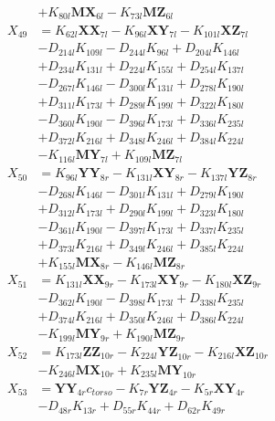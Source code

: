 \begin{multicols}{2}
\begin{align}
&+ K_{80l}\mathbf{MX}_{6l} - K_{73l}\mathbf{MZ}_{6l} \nonumber \\
X_{49} &= K_{62l}\mathbf{XX}_{7l} - K_{96l}\mathbf{XY}_{7l} - K_{101l}\mathbf{XZ}_{7l}  \nonumber \\
&- D_{214l}K_{109l} - D_{244l}K_{96l} + D_{204l}K_{146l}  \nonumber \\
&+ D_{234l}K_{131l} + D_{224l}K_{155l} + D_{254l}K_{137l}  \nonumber \\
&- D_{267l}K_{146l} - D_{300l}K_{131l} + D_{278l}K_{190l}  \nonumber \\
&+ D_{311l}K_{173l} + D_{289l}K_{199l} + D_{322l}K_{180l}  \nonumber \\
&- D_{360l}K_{190l} - D_{396l}K_{173l} + D_{336l}K_{235l}  \nonumber \\
&+ D_{372l}K_{216l} + D_{348l}K_{246l} + D_{384l}K_{224l}  \nonumber \\
&- K_{116l}\mathbf{MY}_{7l} + K_{109l}\mathbf{MZ}_{7l} \nonumber \\
X_{50} &= K_{96l}\mathbf{YY}_{8r} - K_{131l}\mathbf{XY}_{8r} - K_{137l}\mathbf{YZ}_{8r}  \nonumber \\
&- D_{268l}K_{146l} - D_{301l}K_{131l} + D_{279l}K_{190l}  \nonumber \\
&+ D_{312l}K_{173l} + D_{290l}K_{199l} + D_{323l}K_{180l}  \nonumber \\
&- D_{361l}K_{190l} - D_{397l}K_{173l} + D_{337l}K_{235l}  \nonumber \\
&+ D_{373l}K_{216l} + D_{349l}K_{246l} + D_{385l}K_{224l}  \nonumber \\
&+ K_{155l}\mathbf{MX}_{8r} - K_{146l}\mathbf{MZ}_{8r} \nonumber \\
X_{51} &= K_{131l}\mathbf{XX}_{9r} - K_{173l}\mathbf{XY}_{9r} - K_{180l}\mathbf{XZ}_{9r}  \nonumber \\
&- D_{362l}K_{190l} - D_{398l}K_{173l} + D_{338l}K_{235l}  \nonumber \\
&+ D_{374l}K_{216l} + D_{350l}K_{246l} + D_{386l}K_{224l}  \nonumber \\
&- K_{199l}\mathbf{MY}_{9r} + K_{190l}\mathbf{MZ}_{9r} \nonumber \\
X_{52} &= K_{173l}\mathbf{ZZ}_{10r} - K_{224l}\mathbf{YZ}_{10r} - K_{216l}\mathbf{XZ}_{10r}  \nonumber \\
&- K_{246l}\mathbf{MX}_{10r} + K_{235l}\mathbf{MY}_{10r} \nonumber \\
X_{53} &= \mathbf{YY}_{4r}c_{torso} - K_{7r}\mathbf{YZ}_{4r} - K_{5r}\mathbf{XY}_{4r}  \nonumber \\
&- D_{48r}K_{13r} + D_{55r}K_{44r} + D_{62r}K_{49r}  \nonumber \\

\end{align}
\end{multicols}
